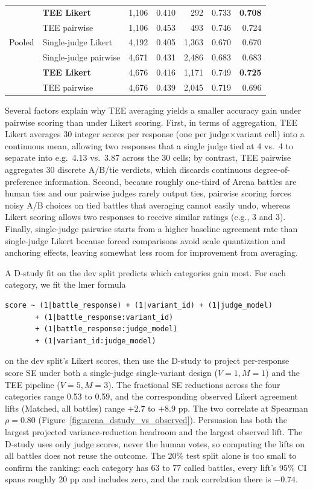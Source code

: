 \begin{table}[ht]
\begin{tabular}{llrrrrr}
                 & \textbf{TEE Likert}    & 1,106 & 0.410 &   292 & 0.733 & \textbf{0.708} \\
                 & TEE pairwise           & 1,106 & 0.453 &   493 & 0.746 & 0.724 \\
\midrule
Pooled           & Single-judge Likert    & 4,192 & 0.405 & 1,363 & 0.670 & 0.670 \\
                 & Single-judge pairwise  & 4,671 & 0.431 & 2,486 & 0.683 & 0.683 \\
                 & \textbf{TEE Likert}    & 4,676 & 0.416 & 1,171 & 0.749 & \textbf{0.725} \\
                 & TEE pairwise           & 4,676 & 0.439 & 2,045 & 0.719 & 0.696 \\
\bottomrule
\end{tabular}
\end{table}

Several factors explain why TEE averaging yields a smaller accuracy gain under pairwise scoring than under Likert scoring. First, in terms of aggregation, TEE Likert averages 30 integer scores per response (one per judge$\times$variant cell) into a continuous mean, allowing two responses that a single judge tied at 4 vs.\ 4 to separate into e.g.\ 4.13 vs.\ 3.87 across the 30 cells; by contrast, TEE pairwise aggregates 30 discrete A/B/tie verdicts, which discards continuous degree-of-preference information. Second, because roughly one-third of Arena battles are human ties and our pairwise judges rarely output ties, pairwise scoring forces noisy A/B choices on tied battles that averaging cannot easily undo, whereas Likert scoring allows two responses to receive similar ratings (e.g., 3 and 3). Finally, single-judge pairwise starts from a higher baseline agreement rate than single-judge Likert because forced comparisons avoid scale quantization and anchoring effects, leaving somewhat less room for improvement from averaging.

A D-study fit on the dev split predicts which categories gain most. For each category, we fit the lmer formula
\begin{verbatim}
score ~ (1|battle_response) + (1|variant_id) + (1|judge_model)
       + (1|battle_response:variant_id)
       + (1|battle_response:judge_model)
       + (1|variant_id:judge_model)
\end{verbatim}
on the dev split's Likert scores, then use the D-study to project per-response score SE under both a single-judge single-variant design ($V{=}1, M{=}1$) and the TEE pipeline ($V{=}5, M{=}3$). The fractional SE reductions across the four categories range 0.53 to 0.59, and the corresponding observed Likert agreement lifts (Matched, all battles) range $+2.7$ to $+8.9$ pp. The two correlate at Spearman $\rho = 0.80$ (Figure~\ref{fig:arena_dstudy_vs_observed}). Persuasion has both the largest projected variance-reduction headroom and the largest observed lift. The D-study uses only judge scores, never the human votes, so computing the lifts on all battles does not reuse the outcome. The 20\% test split alone is too small to confirm the ranking: each category has 63 to 77 called battles, every lift's 95\% CI spans roughly 20 pp and includes zero, and the rank correlation there is $-0.74$.

